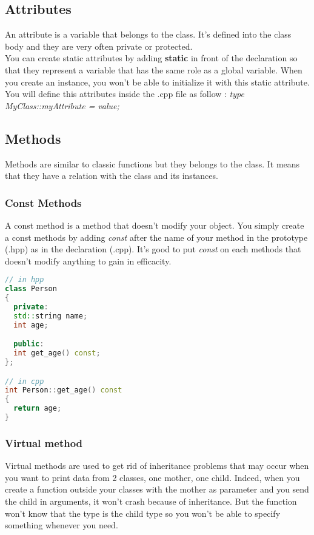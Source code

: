 \documentclass[a4paper, 12pt, titlepage]{scrartcl} %
\begin{document}
\subsection{Attributes}
An attribute is a variable that belongs to the class. It's defined into the class body and they are very often private or protected. \\
You can create static attributes by adding \textbf{static} in front of the declaration so that they represent a variable that has the same role as a global variable. When you create an instance, you won't be able to initialize it with this static attribute. You will define this attributes inside the .cpp file as follow : \textit{type MyClass::myAttribute = value;}

\subsection{Methods}
Methods are similar to classic functions but they belongs to the class. It means that they have a relation with the class and its instances. 

\subsubsection{Const Methods}
A const method is a method that doesn't modify your object. You simply create a const methods by adding \textit{const} after the name of your method in the prototype (.hpp) as in the declaration (.cpp). It's good to put \textit{const} on each methods that doesn't modify anything to gain in efficacity.

\begin{lstlisting}[language=C++]
// in hpp
class Person
{
  private:
  std::string name;
  int age;

  public:
  int get_age() const;
};

// in cpp
int Person::get_age() const
{
  return age;
}
\end{lstlisting} \vspace{5mm}

\subsubsection{Virtual method}
Virtual methods are used to get rid of inheritance problems that may occur when you want to print data from 2 classes, one mother, one child. Indeed, when you create a function outside your classes with the mother as parameter and you send the child in arguments, it won't crash because of inheritance. But the function won't know that the type is the child type so you won't be able to specify something whenever you need.
\end{document}
